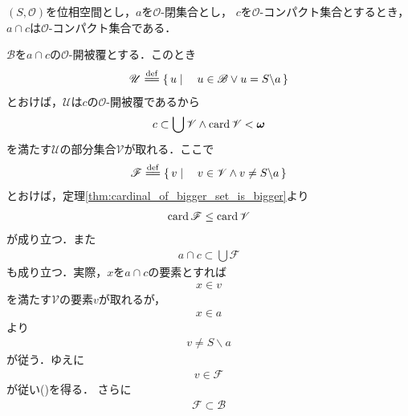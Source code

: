 	\begin{screen}
		\begin{thm}[コンパクト集合の閉部分集合はコンパクト]
		\label{thm:closed_subset_of_compact_set_is_compact_on_Hausdorff_space}
			$(S,\mathscr{O})$を位相空間とし，$a$を$\mathscr{O}$-閉集合とし，
			$c$を$\mathscr{O}$-コンパクト集合とするとき，
			$a \cap c$は$\mathscr{O}$-コンパクト集合である．
		\end{thm}
	\end{screen}
	
	\begin{sketch}
		$\mathscr{B}$を$a \cap c$の$\mathscr{O}$-開被覆とする．このとき
		\begin{align}
			\mathscr{U} \defeq \Set{u}{u \in \mathscr{B} \vee u = S \backslash a}
		\end{align}
		とおけば，$\mathscr{U}$は$c$の$\mathscr{O}$-開被覆であるから
		\begin{align}
			c \subset \bigcup \mathscr{V} \wedge \operatorname{card} \mathscr{V} < {\boldsymbol \omega}
		\end{align}
		を満たす$\mathscr{U}$の部分集合$\mathscr{V}$が取れる．ここで
		\begin{align}
			\mathscr{F} \defeq \Set{v}{v \in \mathscr{V} \wedge v \neq S \backslash a}
		\end{align}
		とおけば，定理\ref{thm:cardinal_of_bigger_set_is_bigger}より
		\begin{align}
			\operatorname{card} \mathscr{F} \leq \operatorname{card} \mathscr{V}
		\end{align}
		が成り立つ．また
		\begin{align}
			a \cap c \subset \bigcup \mathscr{F}
			\label{fom:thm_closed_subset_of_compact_set_is_compact_on_Hausdorff_space_1}
		\end{align}
		も成り立つ．実際，$x$を$a \cap c$の要素とすれば
		\begin{align}
			x \in v
		\end{align}
		を満たす$\mathscr{V}$の要素$v$が取れるが，
		\begin{align}
			x \in a
		\end{align}
		より
		\begin{align}
			v \neq S \backslash a
		\end{align}
		が従う．ゆえに
		\begin{align}
			v \in \mathscr{F}
		\end{align}
		が従い()を得る．
		さらに
		\begin{align}
			\mathscr{F} \subset \mathscr{B}

\end{align}
\end{sketch}
